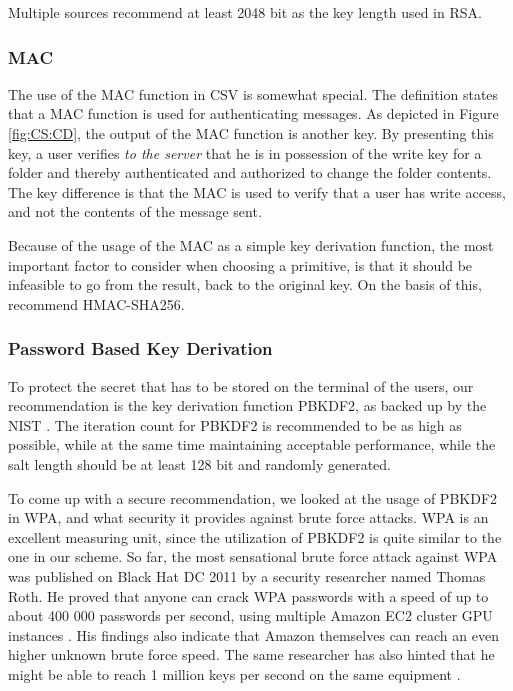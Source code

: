 \documentclass[pdftex,english,10pt,b5paper,twoside]{book}
\begin{document}
Multiple sources \cite{keylength} recommend at least 2048 bit as the key length
used in \ac{RSA}.

\subsubsection{\ac{MAC}}

The use of the \ac{MAC} function in \ac{CSV} is somewhat special. The
definition states that a MAC function is used for authenticating messages.  As
depicted in Figure \ref{fig:CS:CD}, the output of the \ac{MAC} function is
another key. By presenting this key, a user verifies \emph{to the server} that
he is in possession of the write key for a folder and thereby authenticated and
authorized to change the folder contents. The key difference is that the
\ac{MAC} is used to verify that a user has write access, and not the contents
of the message sent.

Because of the usage of the \ac{MAC} as a simple key derivation function, the
most important factor to consider when choosing a primitive, is that it should
be infeasible to go from the result, back to the original key. On the basis of
this, \citet{schneier} recommend HMAC-SHA256.

\subsubsection{Password Based Key Derivation} 
\label{sec:PBKD}

To protect the secret that has to be stored on the terminal of the users, our
recommendation is the key derivation function \ac{PBKDF2}, as backed up by the
\ac{NIST} \cite{pbkdf_nist}. The iteration count for \ac{PBKDF2} is recommended
to be as high as possible, while at the same time maintaining acceptable
performance, while the salt length should be at least 128 bit and randomly
generated. 

To come up with a secure recommendation, we looked at the usage of \ac{PBKDF2}
in \ac{WPA}, and what security it provides against brute force attacks.
\ac{WPA} is an excellent measuring unit, since the utilization of \ac{PBKDF2}
is quite similar to the one in our scheme. So far, the most sensational brute
force attack against \ac{WPA} was published on Black Hat DC 2011 by a security
researcher named Thomas Roth. He proved that anyone can crack \ac{WPA}
passwords with a speed of up to about 400 000 passwords per second, using
multiple Amazon \ac{EC2} cluster \ac{GPU} instances \cite{rothwpa}. His
findings also indicate that Amazon themselves can reach an even higher unknown
brute force speed. The same researcher has also hinted that he might be able to
reach 1 million keys per second on the same equipment \cite{rothblog}.
\end{document}
